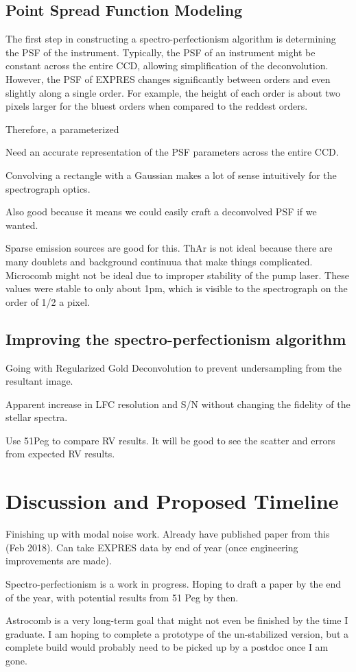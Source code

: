 \documentclass[11pt]{article}
\begin{document}
\subsection{Point Spread Function Modeling}
\label{subsec:psf}

The first step in constructing a spectro-perfectionism algorithm is determining the PSF of the instrument. Typically, the PSF of an instrument might be constant across the entire CCD, allowing simplification of the deconvolution. However, the PSF of EXPRES changes significantly between orders and even slightly along a single order. For example, the height of each order is about two pixels larger for the bluest orders when compared to the reddest orders.

Therefore, a parameterized 

Need an accurate representation of the PSF parameters across the entire CCD.

Convolving a rectangle with a Gaussian makes a lot of sense intuitively for the spectrograph optics.

Also good because it means we could easily craft a deconvolved PSF if we wanted.

Sparse emission sources are good for this. ThAr is not ideal because there are many doublets and background continuua that make things complicated. Microcomb might not be ideal due to improper stability of the pump laser. These values were stable to only about 1pm, which is visible to the spectrograph on the order of 1/2 a pixel.

\subsection{Improving the spectro-perfectionism algorithm}

Going with Regularized Gold Deconvolution to prevent undersampling from the resultant image.

Apparent increase in LFC resolution and S/N without changing the fidelity of the stellar spectra.

Use 51Peg to compare RV results. It will be good to see the scatter and errors from expected RV results.

\section{Discussion and Proposed Timeline}

Finishing up with modal noise work. Already have published paper from this (Feb 2018). Can take EXPRES data by end of year (once engineering improvements are made).

Spectro-perfectionism is a work in progress. Hoping to draft a paper by the end of the year, with potential results from 51 Peg by then.

Astrocomb is a very long-term goal that might not even be finished by the time I graduate. I am hoping to complete a prototype of the un-stabilized version, but a complete build would probably need to be picked up by a postdoc once I am gone.



\pagebreak



\end{document}
